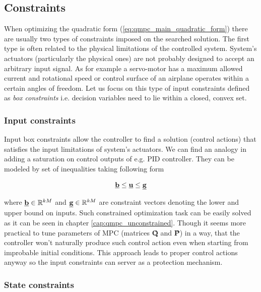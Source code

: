\subsection{Constraints}

When optimizing the quadratic form (\ref{eq:qmpc_main_quadratic_form}) there are usually two types of constraints imposed on the searched solution. The first type is often related to the physical limitations of the controlled system. System's actuators (particularly the physical ones) are not probably designed to accept an arbitrary input signal. As for example a servo-motor has a maximum allowed current and rotational speed or control surface of an airplane operates within a certain angles of freedom. Let us focus on this type of input constraints defined as \textit{box constraints} i.e. decision variables need to lie within a closed, convex set.

\subsubsection{Input constraints}

Input box constraints allow the controller to find a solution (control actions) that satisfies the input limitations of system's actuators. We can find an analogy in adding a saturation on control outputs of e.g. PID controller. They can be modeled by set of inequalities taking following form

\begin{equation}
\begin{split}
\textbf{\underline{b}} \leq \textbf{\underline{u}} \leq \textbf{\underline{g}}
\end{split}
\end{equation}

where $\textbf{\underline{b}} \in \mathbb{R}^{kM}$ and $\textbf{\underline{g}} \in \mathbb{R}^{kM}$ are constraint vectors denoting the lower and upper bound on inputs. Such constrained optimization task can be easily solved as it can be seen in chapter \ref{cap:qmpc_unconstrained}. Though it seems more practical to tune parameters of MPC (matrices \textbf{\^Q} and \textbf{\^P}) in a way, that the controller won't naturally produce such control action even when starting from improbable initial conditions. This approach leads to proper control actions anyway so the input constraints can server as a protection mechanism.

\subsubsection{State constraints}
 
